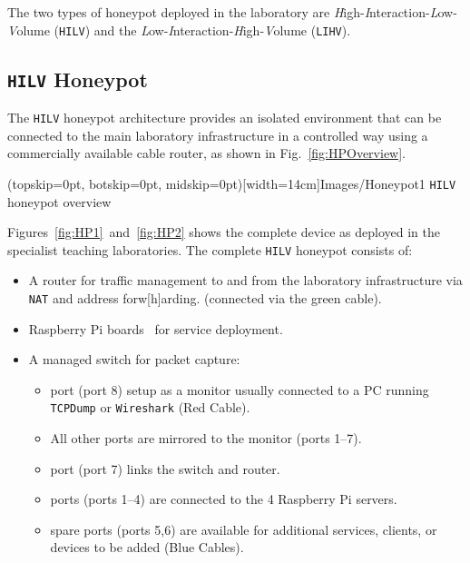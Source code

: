 \documentclass{ieeeaccess}
\begin{document}
The two types of honeypot deployed in the laboratory are
\emph{H}igh-\emph{I}nteraction-\emph{L}ow-\emph{V}olume (\texttt{HILV}) and the
\emph{L}ow-\emph{I}nteraction-\emph{H}igh-\emph{V}olume (\texttt{LIHV}).

\subsection{\texttt{HILV} Honeypot}

The \texttt{HILV} honeypot architecture provides an isolated environment that
can be connected to the main laboratory infrastructure in a controlled way
using a commercially available cable router, as shown in
Fig.~\ref{fig:HPOverview}.

\Figure[t!](topskip=0pt, botskip=0pt, midskip=0pt)[width=14cm]{Images/Honeypot1}
{\texttt{HILV} honeypot overview\label{fig:HPOverview}}


Figures~\ref{fig:HP1}~and~\ref{fig:HP2} shows the complete device as deployed
in the specialist teaching laboratories. The complete \texttt{HILV} honeypot
consists of:

\begin{itemize}
    \item \noindent A router for traffic management to and from the laboratory
      infrastructure via \texttt{NAT} and address forw[h]arding. (connected via the
      green cable). 
    \item {} Raspberry Pi boards~\cite{RASP:17} for service deployment.
    \item \noindent A managed switch for packet capture:
    \begin{itemize}
        \item {} port (port 8) setup as a monitor usually connected to
          a PC running \texttt{TCPDump} or \texttt{Wireshark} (Red Cable).
        \item \noindent All other ports are mirrored to the monitor (ports
          1--7).
        \item {} port (port 7) links the switch and router.
        \item {} ports (ports 1--4) are connected to the 4 Raspberry Pi 
        servers.
        \item {} spare ports (ports 5,6) are available for additional
          services, clients, or devices to be added (Blue Cables).
    \end{itemize}
\end{itemize}
\end{document}
